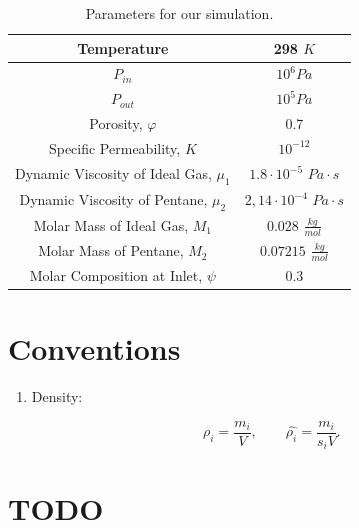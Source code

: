 \documentclass[a4paper,12pt]{article}
\begin{document}
\begin{table}[H]
    \centering
    \caption{Parameters for our simulation.}
    \label{tab:label}
    \begin{tabular}{| c | c |}
        \hline
        Temperature & 298 \(K\) \\
        \hline
        \(P_{in}\) & \(10^6 Pa\) \\
        \hline
        \(P_{out}\) & \(10^5 Pa\) \\
        \hline
        Porosity, \(\varphi\) & 0.7 \\
        \hline
        Specific Permeability, \(K\) & \(10^{-12}\) \\
        \hline
        Dynamic Viscosity of Ideal Gas, \(\mu_1\) &
        \(1.8 \cdot 10^{-5}\) \(Pa \cdot s\) \\
        \hline
        Dynamic Viscosity of Pentane, \(\mu_2\) &
        \(2,14 \cdot 10^{-4}\) \( Pa \cdot s\) \\
        \hline
        Molar Mass of Ideal Gas, \(M_1\) & 
        \(0.028\) \(\frac{kg}{mol}\) \\
        \hline
        Molar Mass of Pentane, \(M_2\) & 
        \(0.07215\) \(\frac{kg}{mol}\) \\
        \hline
        Molar Composition at Inlet, \(\psi\) &
        \(0.3\) \\
        \hline
    \end{tabular}
\end{table}

\section{Conventions}

\begin{enumerate}

    \item Density:

        \[
            \rho_i = \frac{m_i}{V}, \qquad
            \hat{\rho_i} = \frac{m_i}{s_i V}
        .\] 

\end{enumerate}

\section{TODO}
\end{document}

